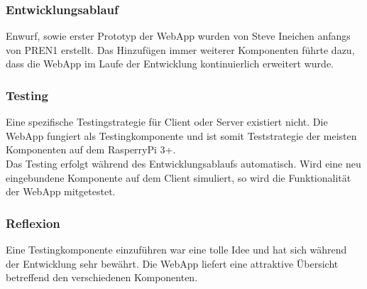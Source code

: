 \documentclass[../../main.tex]{subfiles}
\begin{document}
\pagebreak

\subsubsection{Entwicklungsablauf}
Enwurf, sowie erster Prototyp der WebApp wurden von Steve Ineichen anfangs von PREN1 erstellt. Das Hinzufügen immer weiterer Komponenten führte dazu, dass die WebApp im Laufe der Entwicklung kontinuierlich erweitert wurde.

\subsubsection{Testing}
Eine spezifische Testingstrategie für Client oder Server existiert nicht. Die WebApp fungiert als Testingkomponente und ist somit Teststrategie der meisten Komponenten auf dem RasperryPi 3+.
\\
Das Testing erfolgt während des Entwicklungsablaufs automatisch. Wird eine neu eingebundene Komponente auf dem Client simuliert, so wird die Funktionalität der WebApp mitgetestet.

\subsubsection{Reflexion}
Eine Testingkomponente einzuführen war eine tolle Idee und hat sich während der Entwicklung sehr bewährt. Die WebApp liefert eine attraktive Übersicht betreffend den verschiedenen Komponenten.
\end{document}
